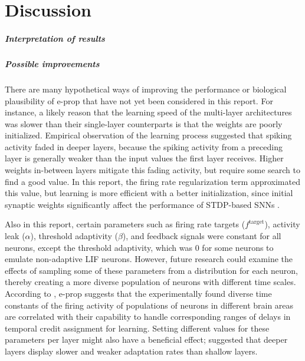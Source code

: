 \chapter{Discussion}\label{ch:discussion}

\paragraph{Interpretation of results}



\paragraph{Possible improvements}
    There are many hypothetical ways of improving the performance or biological plausibility of e-prop that have not yet been considered in this report.
    For instance, a likely reason that the learning speed of the multi-layer architectures was slower than their single-layer counterparts is that the weights are poorly initialized.
    Empirical observation of the learning process suggested that spiking activity faded in deeper layers, because the spiking activity from a preceding layer is generally weaker than the input values the first layer receives.
    Higher weights in-between layers mitigate this fading activity, but require some search to find a good value.
    In this report, the firing rate regularization term approximated this value, but learning is more efficient with a better initialization, since initial synaptic weights significantly affect the performance of STDP-based SNNs \citep{kim2020initial}.

    Also in this report, certain parameters such as firing rate targets ($f^\text{target}$), activity leak ($\alpha$), threshold adaptivity ($\beta$), and feedback signals were constant for all neurons, except the threshold adaptivity, which was 0 for some neurons to emulate non-adaptive LIF neurons.
    However, future research could examine the effects of sampling some of these parameters from a distribution for each neuron, thereby creating a more diverse population of neurons with different time scales.
    According to \citet{bellec2020solution}, e-prop suggests that the experimentally found diverse time constants of the firing activity of populations of neurons in different brain areas \citep{runyan2017distinct} are correlated with their capability to handle corresponding ranges of delays in temporal credit assignment for learning.
    Setting different values for these parameters per layer might also have a beneficial effect; \citet{ahmed1998estimates} suggested that deeper layers display slower and weaker adaptation rates than shallow layers.

